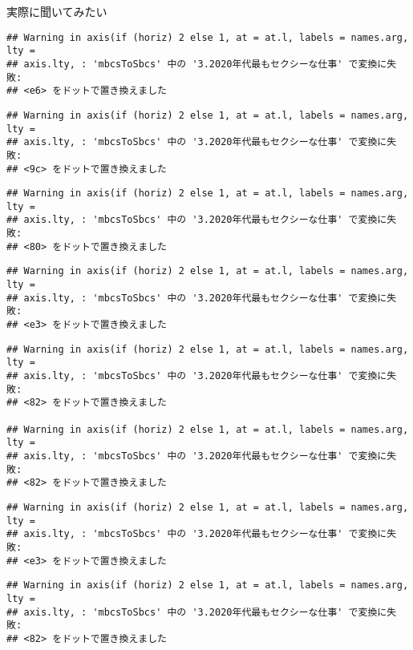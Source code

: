 \documentclass[ignorenonframetext,]{beamer}
\begin{document}
\begin{frame}[fragile]{実際に聞いてみたい}
\begin{verbatim}
## Warning in axis(if (horiz) 2 else 1, at = at.l, labels = names.arg, lty =
## axis.lty, : 'mbcsToSbcs' 中の '3.2020年代最もセクシーな仕事' で変換に失敗:
## <e6> をドットで置き換えました
\end{verbatim}

\begin{verbatim}
## Warning in axis(if (horiz) 2 else 1, at = at.l, labels = names.arg, lty =
## axis.lty, : 'mbcsToSbcs' 中の '3.2020年代最もセクシーな仕事' で変換に失敗:
## <9c> をドットで置き換えました
\end{verbatim}

\begin{verbatim}
## Warning in axis(if (horiz) 2 else 1, at = at.l, labels = names.arg, lty =
## axis.lty, : 'mbcsToSbcs' 中の '3.2020年代最もセクシーな仕事' で変換に失敗:
## <80> をドットで置き換えました
\end{verbatim}

\begin{verbatim}
## Warning in axis(if (horiz) 2 else 1, at = at.l, labels = names.arg, lty =
## axis.lty, : 'mbcsToSbcs' 中の '3.2020年代最もセクシーな仕事' で変換に失敗:
## <e3> をドットで置き換えました
\end{verbatim}

\begin{verbatim}
## Warning in axis(if (horiz) 2 else 1, at = at.l, labels = names.arg, lty =
## axis.lty, : 'mbcsToSbcs' 中の '3.2020年代最もセクシーな仕事' で変換に失敗:
## <82> をドットで置き換えました

## Warning in axis(if (horiz) 2 else 1, at = at.l, labels = names.arg, lty =
## axis.lty, : 'mbcsToSbcs' 中の '3.2020年代最もセクシーな仕事' で変換に失敗:
## <82> をドットで置き換えました
\end{verbatim}

\begin{verbatim}
## Warning in axis(if (horiz) 2 else 1, at = at.l, labels = names.arg, lty =
## axis.lty, : 'mbcsToSbcs' 中の '3.2020年代最もセクシーな仕事' で変換に失敗:
## <e3> をドットで置き換えました
\end{verbatim}

\begin{verbatim}
## Warning in axis(if (horiz) 2 else 1, at = at.l, labels = names.arg, lty =
## axis.lty, : 'mbcsToSbcs' 中の '3.2020年代最もセクシーな仕事' で変換に失敗:
## <82> をドットで置き換えました
\end{verbatim}


\end{frame}
\end{document}
